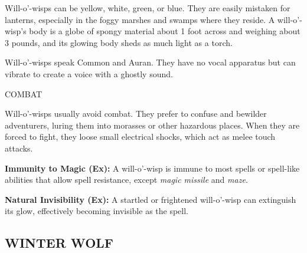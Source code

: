 \documentclass{article}
\begin{document}
Will-o'-wisps can be yellow, white, green, or blue. They are easily mistaken for 
lanterns, especially in the foggy marshes and swamps where they reside. A will-o'-wisp's 
body is a globe of spongy material about 1 foot across and weighing about 3 pounds, 
and its glowing body sheds as much light as a torch.

Will-o'-wisps speak Common and Auran. They have no vocal apparatus but can vibrate 
to create a voice with a ghostly sound.

COMBAT

Will-o'-wisps usually avoid combat. They prefer to confuse and bewilder adventurers, 
luring them into morasses or other hazardous places. When they are forced to fight, 
they loose small electrical shocks, which act as melee touch attacks.

\textbf{Immunity to Magic (Ex): }A will-o'-wisp is immune to most spells or spell-like 
abilities that allow spell resistance, except \textit{magic missile }and \textit{maze.}

\textbf{Natural Invisibility (Ex): }A startled or frightened will-o'-wisp can extinguish 
its glow, effectively becoming invisible as the spell.

\vspace{12pt}
\subsection*{{\LARGE{}WINTER WOLF}}
\end{document}
